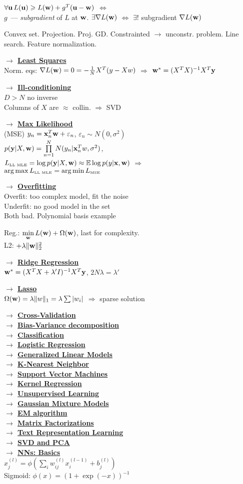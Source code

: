 \documentclass[]{article}
\newcommand{\myvector}[1]{{\bf{#1}}}
\newcommand{\x}{\myvector{x}}
\newcommand{\y}{\myvector{y}}
\newcommand{\w}{\myvector{w}}
\newcommand{\uu}{\myvector{u}}
\newcommand{\mytitle}[1]{ {\bf $\rightarrow$ \underline{#1}}\\}
\begin{document}
\begin{multicols*}{2}
$\forall\uu\,L(\uu)\geqslant L(\w)+g^T(\uu-\w)$ $\Leftrightarrow$\\
$g$~--- {\em subgradient} of $L$ at $\w$. $\exists \nabla L(\w)$ $\Leftrightarrow$
$\exists!$ subgradient $\nabla L(\w)$

Convex set. Projection. Proj. GD. Constrainted $\rightarrow$ unconstr. problem. Line search. Feature normalization. 

\mytitle{Least Squares}
Norm. eqs: $\nabla L(\w)=0=-\frac{1}{N}X^T(y-Xw)$
$\Rightarrow$ $\w^*=(X^TX)^{-1}X^T\myvector{y}$

\mytitle{Ill-conditioning}
$D>N$ no inverse\\
Columns of $X$ are $\approx$ collin. $\Rightarrow$ SVD

\mytitle{Max Likelihood}
(MSE) $y_n=\x_n^T\w+\varepsilon_n$, $\varepsilon_n\sim N(0, \sigma^2)$\\
$p(\y|X,\w)=\prod\limits_{n=1}^NN(y_n|\x_n^Tw,\sigma^2)$,\\
$L_{\mbox{\tiny LL MLE}}=\log p(\y|X,\w)\approx \mathbb{E}\log p(y|\x,\w)$ $\Rightarrow$\\
$\arg\max L_{\mbox{\tiny LL MLE}}=\arg\min L_{\mbox{\tiny MSE}}$

\mytitle{Overfitting}
Overfit: too complex model, fit the noise\\
Underfit: no good model in the set\\
Both bad. Polynomial basis example

Reg.: $\min\limits_\w L(\w)+\Omega(\w)$, last for complexity.\\
L2: $+\lambda \|\w\|_2^2$

\mytitle{Ridge Regression}
$\w^*=(X^TX+\lambda'I)^{-1}X^T\y$, $2N\lambda=\lambda'$

\mytitle{Lasso}
$\Omega(\w)=\lambda \|w\|_1=\lambda\sum |w_i|$ $\Rightarrow$ sparse solution

\mytitle{Cross-Validation}
\mytitle{Bias-Variance decomposition}
\mytitle{Classification}
\mytitle{Logistic Regression}
\mytitle{Generalized Linear Models}
\mytitle{K-Nearest Neighbor}
\mytitle{Support Vector Machines}
\mytitle{Kernel Regression}
\mytitle{Unsupervised Learning}
\mytitle{Gaussian Mixture Models}
\mytitle{EM algorithm}
\mytitle{Matrix Factorizations}
\mytitle{Text Representation Learning}
\mytitle{SVD and PCA}
\mytitle{NNs: Basics}
$x_j^{(l)}=\phi\left(\sum\limits_iw_{ij}^{(l)}x_i^{(l-1)}+b_j^{(l)}\right)$\\
Sigmoid: $\phi(x)=(1+\exp(-x))^{-1}$\\


\end{multicols*}
\end{document}
